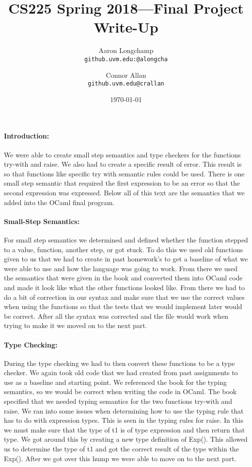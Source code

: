 \documentclass{article}
\title{CS225 Spring 2018---Final Project Write-Up}
\author{
  Aaron Longchamp \\ \small{\texttt{github.uvm.edu:@alongcha}}
  \and Connor Allan \\ \small{\texttt{github.uvm.edu@crallan}}
}
\date{\today}
\begin{document}
\maketitle

\paragraph{Introduction:}
We were able to create small step semantics and type checkers for the functions try-with and raise. We also had to create a specific result of error. This result is so that functions like specific try with semantic rules could be used. There is one small step semantic that required the first expression to be an error so that the second expression was expressed. Below all of this text are the semantics that we added into the OCaml final program. 

\paragraph{Small-Step Semantics:}
For small step semantics we determined and defined whether the function stepped to a value, function, another step, or got stuck. To do this we used old functions given to us that we had to create in past homework’s to get a baseline of what we were able to use and how the language was going to work. From there we used the semantics that were given in the book and converted them into OCaml code and made it look like what the other functions looked like. From there we had to do a bit of correction in our syntax and make sure that we use the correct values when using the functions so that the tests that we would implement later would be correct. After all the syntax was corrected and the file would work when trying to make it we moved on to the next part. 

\paragraph{Type Checking:}
During the type checking we had to then convert these functions to be a type checker. We again took old code that we had created from past assignments to use as a baseline and starting point. We referenced the book for the typing semantics, so we would be correct when writing the code in OCaml. The book specified that we needed typing semantics for the two functions try-with and raise. We ran into some issues when determining how to use the typing rule that has to do with expression types. This is seen in the typing rules for raise. In this we must make sure that the type of t1 is of type expression and then return that type. We got around this by creating a new type definition of Exp(). This allowed us to determine the type of t1 and got the correct result of the type within the Exp(). After we got over this hump we were able to move on to the next part. 
\end{document}

